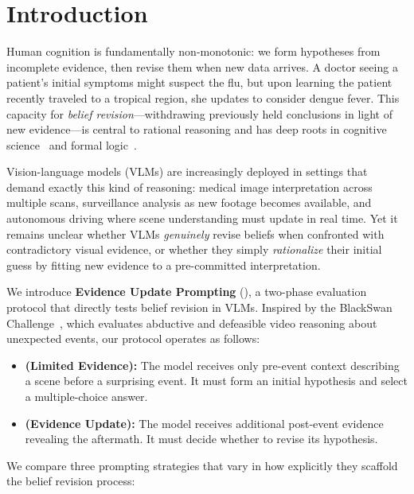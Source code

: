\section{Introduction}
\label{sec:intro}

Human cognition is fundamentally non-monotonic: we form hypotheses from incomplete evidence, then revise them when new data arrives.  A doctor seeing a patient's initial symptoms might suspect the flu, but upon learning the patient recently traveled to a tropical region, she updates to consider dengue fever.  This capacity for \emph{belief revision}---withdrawing previously held conclusions in light of new evidence---is central to rational reasoning and has deep roots in cognitive science~\cite{pollock1987defeasible} and formal logic~\cite{reiter1980logic, mccarthy1980circumscription}.

Vision-language models (VLMs) are increasingly deployed in settings that demand exactly this kind of reasoning: medical image interpretation across multiple scans, surveillance analysis as new footage becomes available, and autonomous driving where scene understanding must update in real time.  Yet it remains unclear whether VLMs \emph{genuinely} revise beliefs when confronted with contradictory visual evidence, or whether they simply \emph{rationalize} their initial guess by fitting new evidence to a pre-committed interpretation.

We introduce \textbf{Evidence Update Prompting} (\method), a two-phase evaluation protocol that directly tests belief revision in VLMs.  Inspired by the BlackSwan Challenge~\cite{chinchure2025blackswan}, which evaluates abductive and defeasible video reasoning about unexpected events, our protocol operates as follows:

\begin{itemize}[leftmargin=*, nosep, topsep=2pt]
    \item \textbf{\phaseA (Limited Evidence):} The model receives only pre-event context describing a scene before a surprising event.  It must form an initial hypothesis and select a multiple-choice answer.
    \item \textbf{\phaseB (Evidence Update):} The model receives additional post-event evidence revealing the aftermath.  It must decide whether to revise its hypothesis.
\end{itemize}

We compare three prompting strategies that vary in how explicitly they scaffold the belief revision process:


